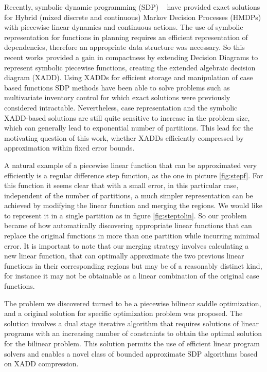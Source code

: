 Recently, symbolic dynamic programming (SDP) ~\cite{sanner_uai11} have provided exact solutions for Hybrid (mixed discrete and continuous) Markov Decision Processes (HMDPs) with piecewise linear dynamics and continuous actions\cite{zamani12}. The use of symbolic representation for functions in planning requires an efficient representation of dependencies, therefore an appropriate data structure was necessary. So this recent works provided a gain in compactness by extending Decision Diagrams to represent symbolic piecewise functions, creating the extended algebraic decision diagram (XADD). Using XADDs for efficient storage and manipulation of case based functions SDP methods have been able to solve problems such as multivariate inventory control for which exact solutions were previously considered intractable. Nevertheless, case representation and the symbolic XADD-based solutions are still quite sensitive to increase in the problem size, which can generally lead to exponential number of partitions. This lead for the motivating question of this work, whether XADDs efficiently compressed by approximation within fixed error bounds.

 A natural example of a piecewise linear function that can be approximated very efficiently is a regular difference step function, as the one in picture \ref{fig:stepf}. For this function it seems clear that with a small error, in this particular case, independent of the number of partitions, a much simpler representation can be achieved by modifying the linear function and merging the regions. We would like to represent it in a single partition as in figure \ref{fig:steptolin}. So our problem became of how automatically discovering appropriate linear functions that can replace the original functions in more than one partition while incurring minimal error. It is important to note that our merging strategy involves calculating a new linear function, that can optimally approximate the two previous linear functions in their corresponding regions but may be of a reasonably distinct kind, for instance it may not be obtainable as a linear combination of the original case functions.
 
The problem we discovered turned to be a piecewise bilinear saddle optimization, and a original solution for specific optimization problem was proposed. The solution involves a dual stage iterative algorithm that requires solutions of linear programs with an increasing number of constraints to obtain the optimal solution for the bilinear problem. This solution permits
the use of efficient linear program solvers and enables a novel class
of bounded approximate SDP algorithms based on XADD compression.


